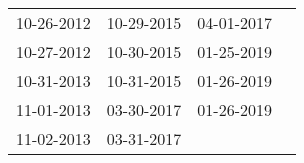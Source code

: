 \begin{supertabular}{llll}
 10-26-2012 &  10-29-2015 &  04-01-2017 \\
 10-27-2012 &  10-30-2015 &  01-25-2019 \\
 10-31-2013 &  10-31-2015 &  01-26-2019 \\
 11-01-2013 &  03-30-2017 &  01-26-2019 \\
 11-02-2013 &  03-31-2017 &             \\
\end{supertabular}
